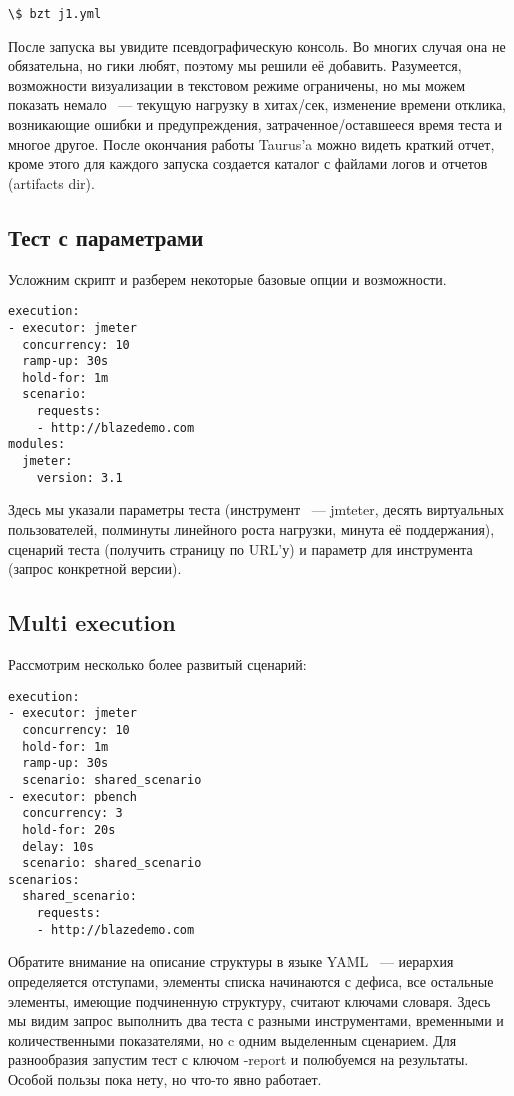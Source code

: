 \documentclass[10pt, a5paper]{article}
\begin{document}
\begin{verbatim}
\$ bzt j1.yml \end{verbatim}
После запуска вы увидите псевдографическую консоль. Во многих случая она не обязательна, но гики любят, поэтому мы решили её добавить. Разумеется, возможности визуализации в текстовом режиме ограничены, но мы можем показать немало ~--- текущую нагрузку в хитах/сек, изменение времени отклика, возникающие ошибки и предупреждения, затраченное/оставшееся время теста и многое другое. После окончания работы Taurus'a можно видеть краткий отчет, кроме этого для каждого запуска создается каталог с файлами логов и отчетов (artifacts dir).

\subsection*{Тест с параметрами}

Усложним скрипт и разберем некоторые базовые опции и возможности.

\begin{verbatim}
execution:
- executor: jmeter
  concurrency: 10
  ramp-up: 30s
  hold-for: 1m
  scenario:
    requests:
    - http://blazedemo.com
modules:
  jmeter:
    version: 3.1\end{verbatim}
Здесь мы указали параметры теста (инструмент ~--- jmteter, десять виртуальных пользователей, полминуты линейного роста нагрузки, минута её поддержания), сценарий теста (получить страницу по URL'у) и параметр для инструмента (запрос конкретной версии).

\subsection*{Multi execution}

Рассмотрим несколько более развитый сценарий:

\begin{verbatim}
execution:
- executor: jmeter
  concurrency: 10
  hold-for: 1m
  ramp-up: 30s
  scenario: shared_scenario
- executor: pbench
  concurrency: 3
  hold-for: 20s
  delay: 10s
  scenario: shared_scenario
scenarios:
  shared_scenario:
    requests:
    - http://blazedemo.com\end{verbatim}
Обратите внимание на описание структуры в языке YAML ~--- иерархия определяется отступами, элементы списка начинаются с дефиса, все остальные элементы, имеющие подчиненную структуру, считают ключами словаря. 
Здесь мы видим запрос выполнить два теста с разными инструментами, временными и количественными показателями, но c одним выделенным сценарием. Для разнообразия запустим тест с ключом -report и полюбуемся на результаты.
Особой пользы пока нету, но что-то явно работает.
\end{document}
